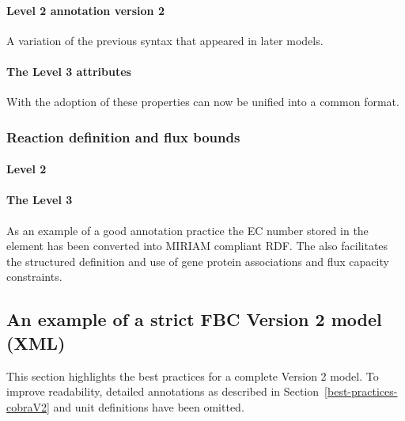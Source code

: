 \paragraph{\SBML Level 2 \Species annotation version 2}
A variation of the previous syntax that appeared in later models.

\bigskip\smallskip
{}

\paragraph{The \SBML Level 3 \FBC \Species attributes}
With the adoption of \SBML \FBC these \Species properties can now be unified into a common format.
%

\subsubsection*{Reaction definition and flux bounds}
\paragraph{\SBML Level 2 \Reaction}
%


\paragraph{The \SBML Level 3 \FBC \Reaction}

As an example of a good annotation practice the \textsf{EC number} stored in the \Notes element has been converted into MIRIAM compliant RDF. The \FBCPackage also facilitates the structured definition and use of gene protein associations and flux capacity constraints.
%
\bigskip\bigskip
{}
%

\newpage
\subsection{An example of a strict FBC Version 2 model (XML)}
\label{best-practices-V2}
This section highlights the best practices for a complete \FBC Version 2 model. To improve readability, detailed annotations as described in Section~\ref{best-practices-cobraV2} and unit definitions have been omitted.


